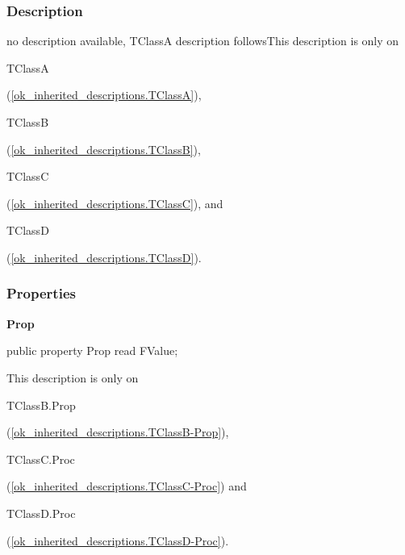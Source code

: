 \documentclass{report}
\newif\ifpdf
\begin{document}
\subsubsection*{\large{\textbf{Description}}\normalsize\hspace{1ex}\hfill}
no description available, TClassA description followsThis description is only on \begin{ttfamily}TClassA\end{ttfamily}(\ref{ok_inherited_descriptions.TClassA}), \begin{ttfamily}TClassB\end{ttfamily}(\ref{ok_inherited_descriptions.TClassB}), \begin{ttfamily}TClassC\end{ttfamily}(\ref{ok_inherited_descriptions.TClassC}), and \begin{ttfamily}TClassD\end{ttfamily}(\ref{ok_inherited_descriptions.TClassD}).\subsubsection*{\large{\textbf{Properties}}\normalsize\hspace{1ex}\hfill}
\begin{list}{}{
\setlength{\itemindent}{0cm}
\setlength{\listparindent}{0cm}
\setlength{\leftmargin}{\evensidemargin}
\addtolength{\leftmargin}{\tmplength}
\settowidth{\labelsep}{X}
\addtolength{\leftmargin}{\labelsep}
\setlength{\labelwidth}{\tmplength}
}
\label{ok_inherited_descriptions.TClassB-Prop}
\item[\textbf{Prop}\hfill]
\ifpdf
\begin{flushleft}
\fi
\begin{ttfamily}
public property Prop read FValue;\end{ttfamily}

\ifpdf
\end{flushleft}
\fi


\par This description is only on \begin{ttfamily}TClassB.Prop\end{ttfamily}(\ref{ok_inherited_descriptions.TClassB-Prop}), \begin{ttfamily}TClassC.Proc\end{ttfamily}(\ref{ok_inherited_descriptions.TClassC-Proc}) and \begin{ttfamily}TClassD.Proc\end{ttfamily}(\ref{ok_inherited_descriptions.TClassD-Proc}).\end{list}
\end{document}
